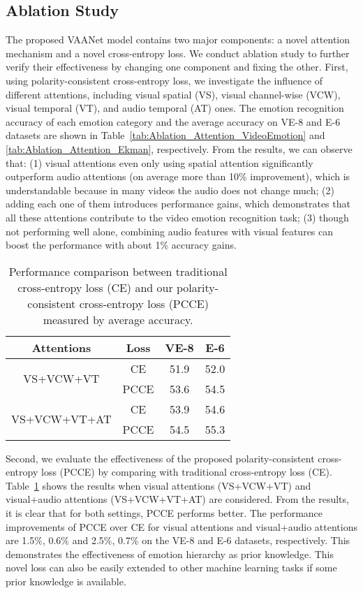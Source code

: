 \documentclass[letterpaper]{article} \usepackage{aaai20}  \usepackage{times}  \usepackage{helvet} \usepackage{courier}  \usepackage[hyphens]{url}  \usepackage{graphicx} \urlstyle{rm} \def\UrlFont{\rm}  \usepackage{graphicx}
\begin{document}
\subsection{Ablation Study}
\label{ssec:Ablation}
The proposed VAANet model contains two major components: a novel attention mechanism and a novel cross-entropy loss. We conduct ablation study to further verify their effectiveness by changing one component and fixing the other. First, using polarity-consistent cross-entropy loss, we investigate the influence of different attentions, including visual spatial (VS), visual channel-wise (VCW), visual temporal (VT), and audio temporal (AT) ones. The emotion recognition accuracy of each emotion category and the average accuracy on VE-8 and E-6 datasets are shown in Table~\ref{tab:Ablation_Attention_VideoEmotion} and \ref{tab:Ablation_Attention_Ekman}, respectively. From the results, we can observe that: (1) visual attentions even only using spatial attention significantly outperform audio attentions (on average more than 10\% improvement), which is understandable because in many videos the audio does not change much; (2) adding each one of them introduces performance gains, which demonstrates that all these attentions contribute to the video emotion recognition task; (3) though not performing well alone, combining audio features with visual features can boost the performance with about 1\% accuracy gains.


\begin{table}[!t]
\centering \caption{Performance comparison between traditional cross-entropy loss (CE) and our polarity-consistent cross-entropy loss (PCCE) measured by average accuracy.}
\begin{tabular}{cccc}
\toprule
Attentions   & Loss & VE-8 & E-6\\
\hline
\multirow{2}{*}{VS+VCW+VT}    & CE   &   51.9    &  52.0 \\
             & PCCE &   53.6   &   54.5 \\
\hline
\multirow{2}{*}{VS+VCW+VT+AT} & CE &    53.9   &   54.6\\
             & PCCE &   54.5   &   55.3 \\
\bottomrule
\end{tabular}
\label{tab:Ablation_Loss}
\end{table}


Second, we evaluate the effectiveness of the proposed polarity-consistent cross-entropy loss (PCCE) by comparing with traditional cross-entropy loss (CE). Table~\ref{tab:Ablation_Loss} shows the results when visual attentions (VS+VCW+VT) and visual+audio attentions (VS+VCW+VT+AT) are considered. From the results, it is clear that for both settings, PCCE performs better. The performance improvements of PCCE over CE for visual attentions and visual+audio attentions are 1.5\%, 0.6\% and 2.5\%, 0.7\% on the VE-8 and E-6 datasets, respectively. This demonstrates the effectiveness of emotion hierarchy as prior knowledge. This novel loss can also be easily extended to other machine learning tasks if some prior knowledge is available.
\end{document}
